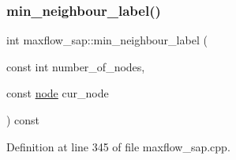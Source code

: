 \subsubsection{\texorpdfstring{min\+\_\+neighbour\+\_\+label()}{min\_neighbour\_label()}}
{\footnotesize\ttfamily int maxflow\+\_\+sap\+::min\+\_\+neighbour\+\_\+label (\begin{DoxyParamCaption}\item[{const int}]{number\+\_\+of\+\_\+nodes,  }\item[{const \mbox{\hyperlink{classnode}{node}}}]{cur\+\_\+node }\end{DoxyParamCaption}) const\hspace{0.3cm}{\ttfamily [protected]}}



Definition at line 345 of file maxflow\+\_\+sap.\+cpp.


